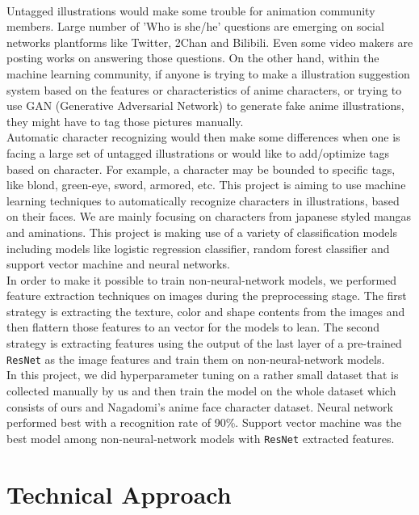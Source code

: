 \documentclass[11.5pt]{article}
\begin{document}
    \\
    Untagged illustrations would make some trouble for animation community members.
    Large number of 'Who is she/he' questions are emerging on social networks plantforms like Twitter, 2Chan and Bilibili.
    Even some video makers are posting works on answering those questions.
    On the other hand, within the machine learning community, if anyone is trying to make a illustration suggestion system based on the features or characteristics of anime characters, or trying to use GAN (Generative Adversarial Network) to generate fake anime illustrations, they might have to tag those pictures manually.\\
    Automatic character recognizing would then make some differences when one is facing a large set of untagged illustrations or would like to add/optimize tags based on character. For example, a character may be bounded to specific tags, like blond, green-eye, sword, armored, etc.
    This project is aiming to use machine learning techniques to automatically recognize characters in illustrations, based on their faces. We are mainly focusing on characters from japanese styled mangas and aminations. This project is making use of a variety of classification models including models like logistic regression classifier, random forest classifier and support vector machine and neural networks.\\
    In order to make it possible to train non-neural-network models, we performed feature extraction techniques on images during the preprocessing stage. The first strategy is extracting the texture, color and shape contents from the images and then flattern those features to an vector for the models to lean. The second strategy is extracting features using the output of the last layer of a pre-trained \texttt{ResNet}\cite{resnet} as the image features and train them on non-neural-network models.\\
    In this project, we did hyperparameter tuning on a rather small dataset that is collected manually by us and then train the model on the whole dataset which consists of ours and Nagadomi's anime face character dataset\cite{dataset}. Neural network performed best with a recognition rate of 90\%. Support vector machine was the best model among non-neural-network models with \texttt{ResNet}\cite{resnet} extracted features.


    \section{Technical Approach}
\end{document}
